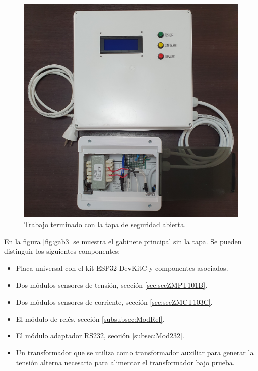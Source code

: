 \begin{figure}[h]
	\centering
	\includegraphics[scale=0.12, angle=270]{./Figures/gab2.jpg}
	\caption{Trabajo terminado con la tapa de seguridad abierta.}
	\label{fig:gab2}
\end{figure}

\pagebreak

En la figura \ref{fig:gab3} se muestra el gabinete principal sin la tapa. Se pueden distinguir los siguientes componentes:

\begin{itemize}
\item Placa universal con el kit ESP32-DevKitC y componentes asociados.
\item Dos módulos sensores de tensión, sección \ref{sec:secZMPT101B}.
\item Dos módulos sensores de corriente, sección \ref{sec:secZMCT103C}.
\item El módulo de relés, sección \ref{subsubsec:ModRel}.
\item El módulo adaptador RS232, sección \ref {subsec:Mod232}.
\item Un transformador que se utiliza como transformador auxiliar para generar la tensión alterna necesaria para alimentar el transformador bajo prueba.
\end{itemize}

